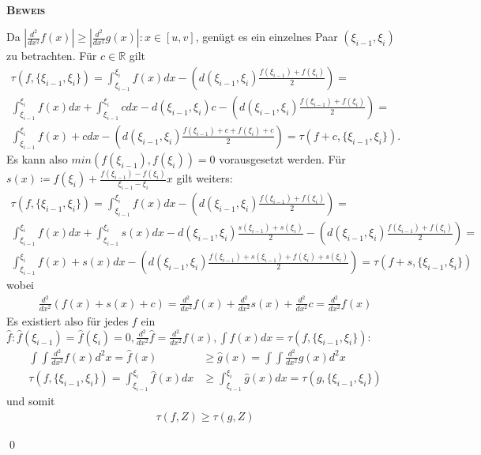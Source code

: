 \documentclass[12pt,a4paper]{scrartcl}
\numberwithin{equation}{section}
\numberwithin{myalgctr}{section}
\numberwithin{mytheoremctr}{subsection}
\numberwithin{mykorollarctr}{subsection}
\numberwithin{mylemmactr}{subsection}
\numberwithin{mybeispielctr}{subsection}
\newenvironment{myproof}{%
	\bigskip\noindent%
	\textsc{\textbf{\\Beweis\\}}%
	\indent
}{\qed\par\bigskip}  %
\begin{document}
	\begin{myproof}
		Da $|\frac{d^2}{dx^2}f(x)|\geq |\frac{d^2}{dx^2}g(x)|:x\in [u,v]$, gen\"ugt es ein einzelnes Paar $(\xi_{i-1},\xi_i)$ zu betrachten. F\"ur $c\in\mathbb{R}$ gilt 
		\begin{gather*}
		\tau(f,\{\xi_{i-1},\xi_i\}) = \int_{\xi_{i-1}}^{\xi_i}f(x)dx - \left(d(\xi_{i-1},\xi_i)\frac{f(\xi_{i-1})+f(\xi_i)}{2}\right) =\\
		\int_{\xi_{i-1}}^{\xi_i}f(x)dx + \int_{\xi_{i-1}}^{\xi_i}cdx - d(\xi_{i-1},\xi_i)c - \left(d(\xi_{i-1},\xi_i)\frac{f(\xi_{i-1})+f(\xi_i)}{2}\right) = \\
		\int_{\xi_{i-1}}^{\xi_i}f(x) + cdx  - \left(d(\xi_{i-1},\xi_i)\frac{f(\xi_{i-1})+c+f(\xi_i)+c}{2}\right) = \tau(f+c,\{\xi_{i-1},\xi_i\}).
		\end{gather*}
		Es kann also $min(f(\xi_{i-1}),f(\xi_{i})) = 0$ vorausgesetzt werden. F\"ur $s(x)\coloneqq f(\xi_{i}) + \frac{f(\xi_{i-1}) - f(\xi_{i})}{\xi_{i-1} - \xi_{i}}x$ gilt weiters:
		\begin{gather*}
		\tau(f,\{\xi_{i-1},\xi_i\}) = \int_{\xi_{i-1}}^{\xi_i}f(x)dx - \left(d(\xi_{i-1},\xi_i)\frac{f(\xi_{i-1})+f(\xi_i)}{2}\right) =\\
		\int_{\xi_{i-1}}^{\xi_i}f(x)dx + \int_{\xi_{i-1}}^{\xi_i}s(x)dx - d(\xi_{i-1},\xi_i)\frac{s(\xi_{i-1})+s(\xi_i)}{2} - \left(d(\xi_{i-1},\xi_i)\frac{f(\xi_{i-1})+f(\xi_i)}{2}\right) = \\
		\int_{\xi_{i-1}}^{\xi_i}f(x) + s(x)dx  - \left(d(\xi_{i-1},\xi_i)\frac{f(\xi_{i-1})+s(\xi_{i-1})+f(\xi_i)+s(\xi_i)}{2}\right) = \tau(f+s,\{\xi_{i-1},\xi_i\})
		\end{gather*} wobei 
		\begin{align*}
		\frac{d^2}{dx^2} (f(x) + s(x) + c) = \frac{d^2}{dx^2}f(x) + \frac{d^2}{dx^2}s(x) + \frac{d^2}{dx^2}c= \frac{d^2}{dx^2}f(x)
		\end{align*}
		Es existiert also f\"ur jedes $f$  ein  $\hat{f}:\hat{f}(\xi_{i-1}) = \hat{f}(\xi_{i}) = 0,\frac{d^2}{dx^2}\hat{f} = \frac{d^2}{dx^2}f(x),\int\hat{f}(x)dx = \tau(f,\{\xi_{i-1},\xi_i\})$:
		\begin{align*}
		\int\int \frac{d^2}{dx^2}f(x)d^2x = \hat{f}(x) &\geq \hat{g}(x) = \int\int \frac{d^2}{dx^2}g(x)d^2x\\
		\tau(f,\{\xi_{i-1},\xi_i\}) = \int_{\xi_{i-1}}^{\xi_{i}}\hat{f}(x)dx&\geq \int_{\xi_{i-1}}^{\xi_{i}}\hat{g}(x)dx = \tau(g,\{\xi_{i-1},\xi_i\})
		\end{align*}
		und somit
		\begin{align*}
		\tau(f,Z)\geq\tau(g,Z)
		\end{align*}
		
	\end{myproof}
\end{document}

